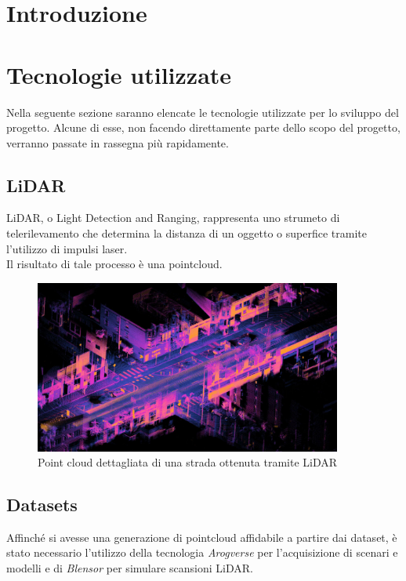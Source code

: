 \documentclass[italian]{article}
\begin{document}
\justifying

\section*{Introduzione}

\section*{Tecnologie utilizzate}
Nella seguente sezione saranno elencate le tecnologie utilizzate per lo sviluppo del progetto. Alcune di esse, non facendo direttamente parte dello scopo del progetto, verranno passate in rassegna più rapidamente.
\subsection{LiDAR}
LiDAR, o Light Detection and Ranging, rappresenta uno strumeto di telerilevamento che determina la distanza di un oggetto o superfice tramite l'utilizzo di impulsi laser.\\
Il risultato di tale processo è una pointcloud.\\
\begin{figure}[H]
	\centering
	\includegraphics[width=0.9\textwidth]{LiDAR}
	\footnotesize
	\caption{Point cloud dettagliata di una strada ottenuta tramite LiDAR}
\end{figure}
\subsection{Datasets}
Affinché si avesse una generazione di pointcloud affidabile a partire dai dataset, è stato necessario l'utilizzo della tecnologia \textit{Arogverse} per l'acquisizione di scenari e modelli e di \textit{Blensor} per simulare scansioni LiDAR.
\end{document}
